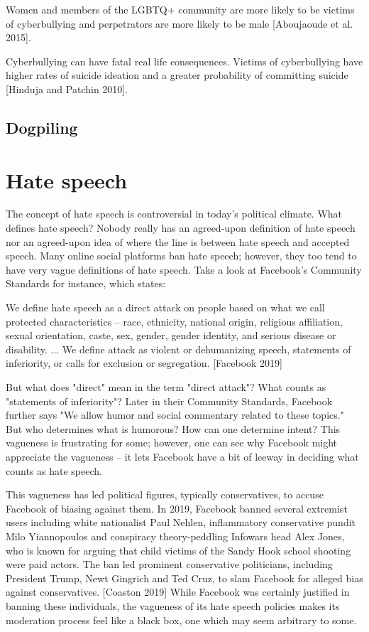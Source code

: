 \documentclass[class=book, crop=false]{standalone}
\begin{document}
Women and members of the LGBTQ+ community are more likely to be victims of cyberbullying and perpetrators are more likely to be male [Aboujaoude et al. 2015].

Cyberbullying can have fatal real life consequences. Victims of cyberbullying have higher rates of suicide ideation and a greater probability of committing suicide [Hinduja and Patchin 2010].

\subsection{Dogpiling}

\section{Hate speech}

The concept of hate speech is controversial in today's political climate. What defines hate speech? Nobody really has an agreed-upon definition of hate speech nor an agreed-upon idea of where the line is between hate speech and accepted speech. Many online social platforms ban hate speech; however, they too tend to have very vague definitions of hate speech. Take a look at Facebook's Community Standards for instance, which states:

\begin{displayquote}
We define hate speech as a direct attack on people based on what we call protected characteristics -- race, ethnicity, national origin, religious affiliation, sexual orientation, caste, sex, gender, gender identity, and serious disease or disability. ... We define attack as violent or dehumanizing speech, statements of inferiority, or calls for exclusion or segregation. [Facebook 2019]
\end{displayquote}

But what does "direct" mean in the term "direct attack"? What counts as "statements of inferiority"? Later in their Community Standards, Facebook further says "We allow humor and social commentary related to these topics." But who determines what is humorous? How can one determine intent? This vagueness is frustrating for some; however, one can see why Facebook might appreciate the vagueness -- it lets Facebook have a bit of leeway in deciding what counts as hate speech.

This vagueness has led political figures, typically conservatives, to accuse Facebook of biasing against them. In 2019, Facebook banned several extremist users including white nationalist Paul Nehlen, inflammatory conservative pundit Milo Yiannopoulos and conspiracy theory-peddling Infowars head Alex Jones, who is known for arguing that child victims of the Sandy Hook school shooting were paid actors. The ban led prominent conservative politicians, including President Trump, Newt Gingrich and Ted Cruz, to slam Facebook for alleged bias against conservatives. [Coaston 2019] While Facebook was certainly justified in banning these individuals, the vagueness of its hate speech policies makes its moderation process feel like a black box, one which may seem arbitrary to some.
\end{document}
